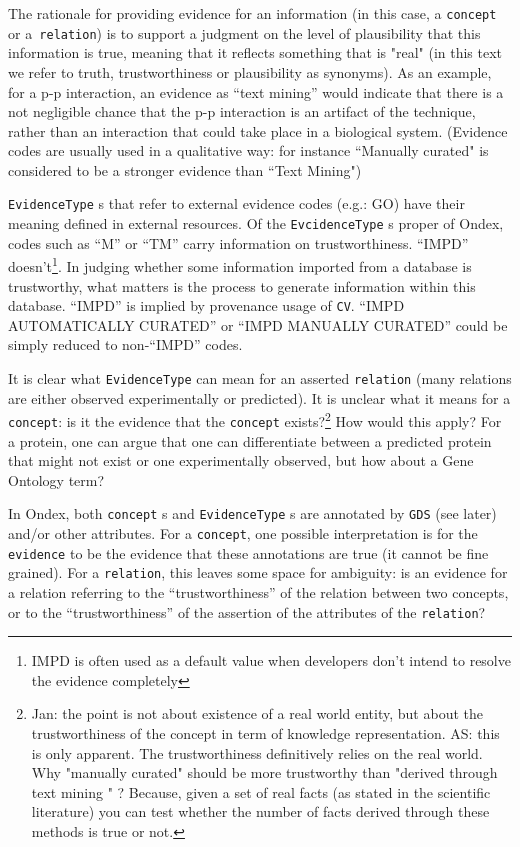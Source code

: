 \documentclass[a4paper,10pt]{article}
\newcommand{\term}[1]{\texttt{#1}\xspace}
\begin{document}
The rationale for providing evidence for an information (in this case, a \term{concept} or a\term{ relation}) is to support a judgment on the level of plausibility that this information is true, meaning that it reflects something that is "real" (in this text we refer to truth, trustworthiness or plausibility as synonyms). As an example, for a p-p interaction, an evidence as ``text mining'' would indicate that there is a not negligible chance that the p-p interaction is an artifact of the technique, rather than an interaction that could take place in a biological system. (Evidence codes are usually used in a qualitative way: for instance ``Manually curated" is considered to be a stronger evidence than ``Text Mining")
\vskip 0.3cm

\term{EvidenceType}s that refer to external evidence codes (e.g.: GO) have their meaning defined in external resources.
Of the \term{EvcidenceType}s proper of Ondex,  codes such as ``M'' or ``TM'' carry information on trustworthiness. ``IMPD'' doesn't\footnote{IMPD is often used as a default value when developers don't intend to resolve the evidence completely}. 
In judging whether some information imported from a database is trustworthy, what matters is the process to generate information within this database. ``IMPD'' is implied by provenance usage of \term{CV}. ``IMPD AUTOMATICALLY CURATED'' or ``IMPD MANUALLY CURATED'' could be simply reduced to non-``IMPD'' codes.
\vskip 0.3cm


It is clear what \term{EvidenceType} can mean for an asserted \term{relation} (many relations are either observed experimentally or predicted). It is unclear what it means for a \term{concept}: is it the evidence that the \term{concept} exists?\footnote{Jan: the point is not about existence of a real world entity, but about the trustworthiness of the concept in term of knowledge representation. AS: this is only apparent. The trustworthiness definitively relies on the real world. Why "manually curated" should be more trustworthy than "derived through text mining " ? Because, given a set of real facts (as stated in the scientific literature) you can test whether the number of facts derived through these methods is true or not.} How would this apply? For a protein, one can argue that one can differentiate between a predicted protein that might not exist or one experimentally observed, but how about a Gene Ontology term?
\vskip 0.3cm

In Ondex, both \term{concept}s and \term{EvidenceType}s are annotated by \term{GDS} (see later) and/or other attributes. For a \term{concept}, one possible interpretation is for the \term{evidence} to be the evidence that these annotations are true (it cannot be fine grained). For a \term{relation}, this leaves some space for ambiguity: is an evidence for a relation referring to the ``trustworthiness'' of the relation between two concepts, or to the ``trustworthiness'' of the assertion of the attributes of the \term{relation}?
\vskip 0.3cm
\end{document}
